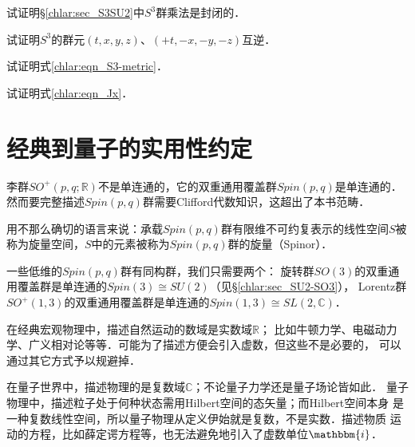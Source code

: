 \begin{exercise}
	试证明\S\ref{chlar:sec_S3SU2}中$S^3$群乘法是封闭的．
\end{exercise}

\begin{exercise}
	试证明$S^3$的群元$(t,x,y,z)$、$(+t,-x,-y,-z)$互逆．
\end{exercise}

\begin{exercise}
	试证明式\eqref{chlar:eqn_S3-metric}．
\end{exercise}

\begin{exercise}
	试证明式\eqref{chlar:eqn_Jx}．
\end{exercise}



\section{经典到量子的实用性约定}\label{chlar:sec_C2Q}



李群$SO^{+}(p,q;\mathbb{R})$不是单连通的，它的双重通用覆盖群$Spin(p,q)$是单连通的．
然而要完整描述$Spin(p,q)$群需要Clifford代数知识，这超出了本书范畴．

用不那么确切的语言来说：承载$Spin(p,q)$群有限维不可约复表示的线性空间$S$被
称为{\heiti 旋量空间}，$S$中的元素被称为$Spin(p,q)$群的{\heiti 旋量}（Spinor）．



一些低维的$Spin(p,q)$群有同构群，我们只需要两个：
旋转群$SO(3)$的双重通用覆盖群是单连通的$Spin(3)  \cong SU(2)$（见\S\ref{chlar:sec_SU2-SO3}），
Lorentz群$SO^{+}(1,3)$的双重通用覆盖群是单连通的$Spin(1,3)\cong SL(2,\mathbb{C})$．

在经典宏观物理中，描述自然运动的数域是实数域$\mathbb{R}$；
比如牛顿力学、电磁动力学、广义相对论等等．可能为了描述方便会引入虚数，但这些不是必要的，
可以通过其它方式予以规避掉．

在量子世界中，描述物理的是复数域$\mathbb{C}$；不论量子力学还是量子场论皆如此．
量子物理中，描述粒子处于何种状态需用Hilbert空间的态矢量；而Hilbert空间本身
是一种复数线性空间，所以量子物理从定义伊始就是复数，不是实数．描述物质
运动的方程，比如薛定谔方程等，也无法避免地引入了虚数单位$\mathbbm{i}$．

